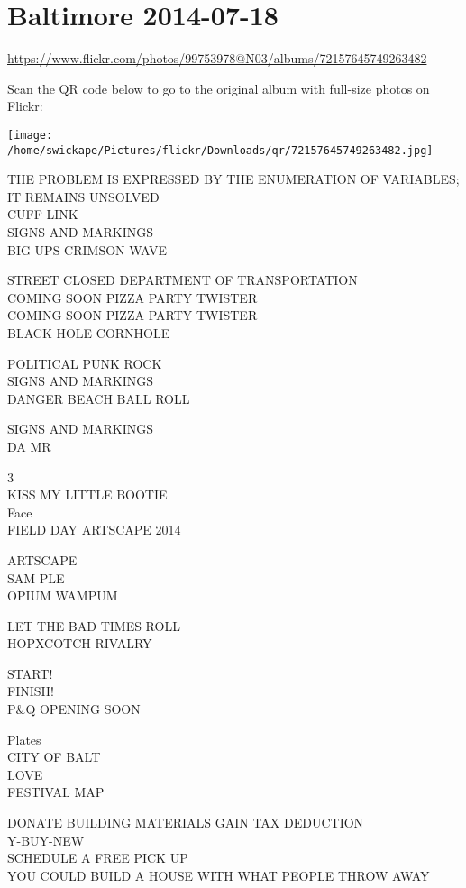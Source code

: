 \documentclass[10pt,letterpaper]{article}
\begin{document}
\section*{Baltimore 2014-07-18}

\url{https://www.flickr.com/photos/99753978@N03/albums/72157645749263482}

Scan the QR code below to go to the original album with full-size photos on Flickr:

\texttt{[image: /home/swickape/Pictures/flickr/Downloads/qr/72157645749263482.jpg]}
\pagebreak

THE PROBLEM IS EXPRESSED BY THE ENUMERATION OF VARIABLES; IT REMAINS UNSOLVED\\
CUFF LINK\\
SIGNS AND MARKINGS\\
BIG UPS CRIMSON WAVE

STREET CLOSED DEPARTMENT OF TRANSPORTATION\\
COMING SOON PIZZA PARTY TWISTER\\
COMING SOON PIZZA PARTY TWISTER\\
BLACK HOLE CORNHOLE

POLITICAL PUNK ROCK\\
SIGNS AND MARKINGS\\
DANGER BEACH BALL ROLL

SIGNS AND MARKINGS\\
DA MR

3\\
KISS MY LITTLE BOOTIE\\
Face\\
FIELD DAY ARTSCAPE 2014

ARTSCAPE\\
SAM PLE\\
OPIUM WAMPUM

LET THE BAD TIMES ROLL\\
HOPXCOTCH RIVALRY

START!\\
FINISH!\\
P\&Q OPENING SOON

Plates\\
CITY OF BALT\\
LOVE\\
FESTIVAL MAP

DONATE BUILDING MATERIALS GAIN TAX DEDUCTION\\
Y{-}BUY{-}NEW\\
SCHEDULE A FREE PICK UP\\
YOU COULD BUILD A HOUSE WITH WHAT PEOPLE THROW AWAY
\end{document}
